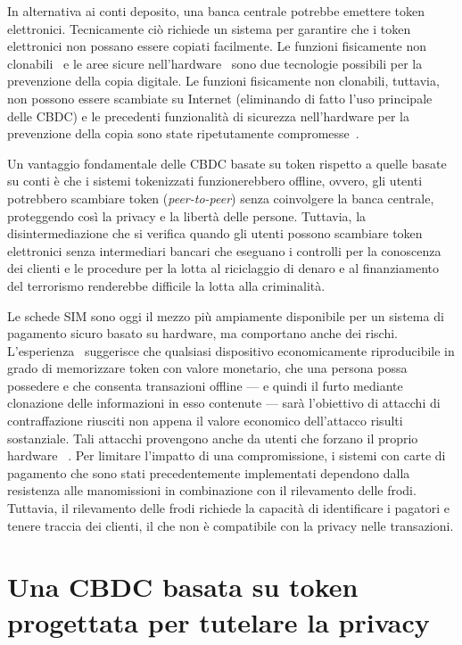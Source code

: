 \documentclass{article}
\begin{document}
In alternativa ai conti deposito, una banca centrale potrebbe emettere 
token elettronici. Tecnicamente ciò richiede un sistema per garantire che 
i token elettronici non possano essere copiati facilmente. Le funzioni 
fisicamente non clonabili~\cite[vedi][]{Katzenbeisser} e le aree 
sicure nell'hardware~\cite[vedi][]{Alves,Pinto} sono due tecnologie 
possibili per la prevenzione della copia digitale. Le funzioni 
fisicamente non clonabili, tuttavia, non possono essere scambiate su 
Internet (eliminando di fatto l'uso principale delle CBDC) e le precedenti 
funzionalità di sicurezza nell'hardware per la prevenzione della copia 
sono state ripetutamente compromesse~\cite[si veda, ad esempio,][]{Wojtczuk,Johnston,Lapid}.

Un vantaggio fondamentale delle CBDC basate su token rispetto a quelle 
basate su conti è che i sistemi tokenizzati funzionerebbero offline, 
ovvero, gli utenti potrebbero scambiare token (\textit{peer-to-peer}) 
senza coinvolgere la banca centrale, proteggendo così la privacy e la 
libertà delle persone. Tuttavia, la disintermediazione che si verifica 
quando gli utenti possono scambiare token elettronici senza 
intermediari bancari che eseguano i controlli per la conoscenza dei 
clienti e le procedure per la lotta al riciclaggio di denaro e al 
finanziamento del terrorismo renderebbe difficile la lotta alla 
criminalità.

Le schede SIM sono oggi il mezzo più ampiamente disponibile per un 
sistema di pagamento sicuro basato su hardware, ma comportano anche 
dei rischi. L'esperienza~\cite[si veda, ad esempio,][]{Soukup,Garcia,Kasper,CCC} 
suggerisce che qualsiasi dispositivo economicamente riproducibile in grado 
di memorizzare token con valore monetario, che una persona possa possedere 
e che consenta transazioni offline --- e quindi il furto mediante 
clonazione delle informazioni in esso contenute --- sarà l'obiettivo di 
attacchi di contraffazione riusciti non appena il valore economico 
dell'attacco risulti sostanziale. Tali attacchi provengono anche da 
utenti che forzano il proprio hardware ~\cite[si veda anche]{Allen}. Per 
limitare l'impatto di una compromissione, i sistemi con carte di pagamento 
che sono stati precedentemente implementati dependono dalla resistenza 
alle manomissioni in combinazione con il rilevamento delle frodi. 
Tuttavia, il rilevamento delle frodi richiede la capacità di identificare 
i pagatori e tenere traccia dei clienti, il che non è compatibile con la 
privacy nelle transazioni.

\section{Una CBDC basata su token progettata per tutelare la privacy}
\label{4.-una-cbdc-basata-su-token-progettata-per-tutelare-la-privacy}
\end{document}
